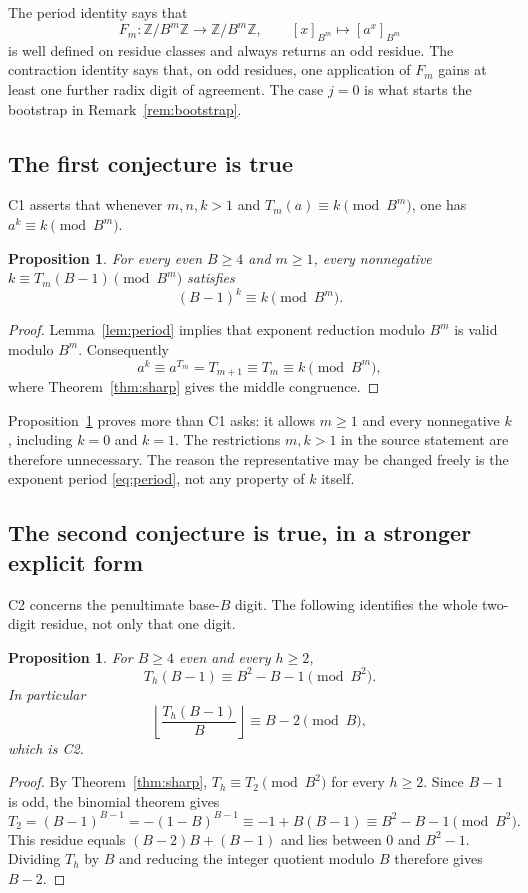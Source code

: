 \documentclass[11pt,letterpaper]{article}
\numberwithin{equation}{section}
\newtheorem{proposition}[theorem]{Proposition}
\theoremstyle{definition}
\theoremstyle{remark}
\newcommand{\Z}{\mathbb Z}
\newcommand{\res}[2]{\left[#1\right]_{#2}}
\newcommand{\floor}[1]{\left\lfloor #1\right\rfloor}
\begin{document}
The period identity says that
\[
 F_m:\Z/B^m\Z\longrightarrow\Z/B^m\Z,\qquad \res{x}{B^m}\longmapsto\res{a^x}{B^m}
\]
is well defined on residue classes and always returns an odd residue. The contraction identity says that, on odd residues, one application of $F_{m}$ gains at least one further radix digit of agreement. The case $j=0$ is what starts the bootstrap in Remark~\ref{rem:bootstrap}.

\subsection{The first conjecture is true}\label{sec:oeis1}

C1 asserts that whenever $m,n,k>1$ and $T_m(a)\equiv k\pmod{B^m}$, one has $a^k\equiv k\pmod{B^m}$.

\begin{proposition}\label{prop:oeis1}
For every even $B\ge4$ and $m\ge1$, every nonnegative $k\equiv T_m(B-1)\pmod{B^m}$ satisfies
\[
 (B-1)^k\equiv k\pmod{B^m}.
\]
\end{proposition}
\begin{proof}
Lemma~\ref{lem:period} implies that exponent reduction modulo $B^m$ is valid modulo $B^m$. Consequently
\[
 a^k\equiv a^{T_m}=T_{m+1}\equiv T_m\equiv k\pmod{B^m},
\]
where Theorem~\ref{thm:sharp} gives the middle congruence.
\end{proof}

Proposition~\ref{prop:oeis1} proves more than C1 asks: it allows $m\ge1$ and every nonnegative $k$, including $k=0$ and $k=1$. The restrictions $m,k>1$ in the source statement are therefore unnecessary. The reason the representative may be changed freely is the exponent period \eqref{eq:period}, not any property of $k$ itself.

\subsection{The second conjecture is true, in a stronger explicit form}\label{sec:oeis2}

C2 concerns the penultimate base-$B$ digit. The following identifies the whole two-digit residue, not only that one digit.

\begin{proposition}\label{prop:oeis2}
For $B\ge4$ even and every $h\ge2$,
\begin{equation}\label{eq:twodigit}
 T_h(B-1)\equiv B^2-B-1\pmod{B^2}.
\end{equation}
In particular
\[
 \floor{\frac{T_h(B-1)}{B}}\equiv B-2\pmod B,
\]
which is C2.
\end{proposition}
\begin{proof}
By Theorem~\ref{thm:sharp}, $T_h\equiv T_2\pmod{B^2}$ for every $h\ge2$. Since $B-1$ is odd, the binomial theorem gives
\[
 T_2=(B-1)^{B-1}=-(1-B)^{B-1}
 \equiv -1+B(B-1)\equiv B^2-B-1\pmod{B^2}.
\]
This residue equals $(B-2)B+(B-1)$ and lies between $0$ and $B^2-1$. Dividing $T_h$ by $B$ and reducing the integer quotient modulo $B$ therefore gives $B-2$.
\end{proof}
\end{document}

